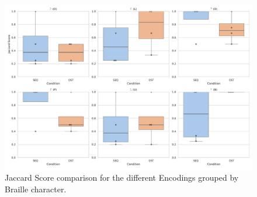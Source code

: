 \begin{figure}
    \centering
    \includegraphics[width=\linewidth]{src/pictures/Study2Data_Experiment/character_jaccard_test_study2.pdf}
    \caption{Jaccard Score comparison for the different Encodings grouped by Braille character.}
    \label{fig:f1score_test_study2}
\end{figure}


\begin{table}[ht]
\caption{Results of the \gls{mwu} for significance grouped by the different Braille characters during learning for the different Encodings with Cohen's d.}
\label{table:learning_significance_results_secondStudy_nonPar}
\end{table}




